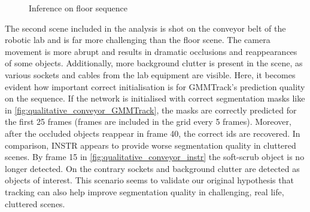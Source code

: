 \begin{figure}[!ht]
    \hfill
    \caption{Inference on floor sequence 
    }
    \label{fig:qualitative_floor}
\end{figure}

The second scene included in the analysis is shot on the conveyor belt of the robotic lab and is far more challenging than the floor scene. The camera movement is more abrupt and results in dramatic occlusions and reappearances of some objects. Additionally, more background clutter is present in the scene, as various sockets and cables from the lab equipment are visible. Here, it becomes evident how important correct initialisation is for GMMTrack's prediction quality on the sequence. If the network is initialised with correct segmentation masks like in \figref\ref{fig:qualitative_conveyor_GMMTrack}, the masks are correctly predicted for the first 25 frames (frames are included in the grid every 5 frames). Moreover, after the occluded objects reappear in frame 40, the correct ids are recovered. In comparison, INSTR appears to provide worse segmentation quality in cluttered scenes. By frame 15 in \figref\ref{fig:qualitative_conveyor_instr} the soft-scrub object is no longer detected. On the contrary sockets and background clutter are detected as objects of interest. This scenario seems to validate our original hypothesis that tracking can  also help improve segmentation quality in challenging, real life, cluttered scenes. 





